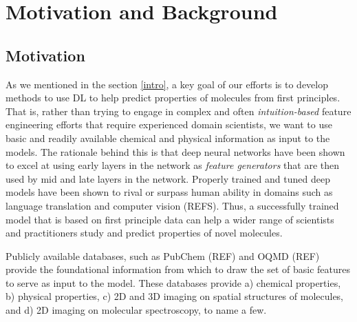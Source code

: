 \section{Motivation and Background  \label{background}}
\subsection{Motivation}
As we mentioned in the section \ref{intro}, a key goal of our efforts  is to develop methods to use DL to help predict properties of molecules from first principles. That is, rather than trying to engage in complex and often {\em intuition-based} feature engineering efforts that require experienced domain scientists, we want to use basic and readily available chemical and physical information as input to the models. The rationale behind this is that deep neural networks have been shown to excel at using early layers in the network as {\em feature generators} that are then used by mid and late layers in the network. Properly trained and tuned deep models have been shown to rival or surpass  human ability in domains such as language translation and computer vision (REFS). Thus, a successfully trained model that is based on first principle data can help a wider range of scientists and practitioners study and predict properties of novel molecules. 

Publicly available databases, such as PubChem (REF) and OQMD (REF) provide the foundational information from which to draw the set of basic features to serve as input  to the model. These databases provide a) chemical properties, b) physical properties, c) 2D and 3D imaging on spatial structures of molecules,  and d) 2D imaging on molecular spectroscopy, to name a few.

